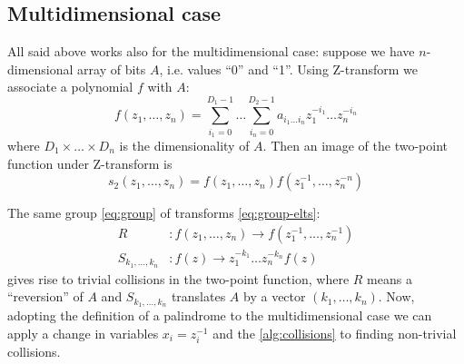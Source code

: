 \documentclass[12pt, a4paper]{article}
\begin{document}
\subsection{Multidimensional case}
All said above works also for the multidimensional case: suppose we have
$n$-dimensional array of bits $A$, i.e. values ``0'' and ``1''. Using
Z-transform we associate a polynomial $f$ with $A$:
\begin{equation*}
  f(z_1, \dots, z_n) = \sum_{i_1=0}^{D_1 - 1} \dots \sum_{i_n=0}^{D_2 - 1}
  a_{i_1\dots i_n} z_1^{-i_1} \dots z_n^{-i_n}
\end{equation*}
where $D_1 \times \dots \times D_n$ is the dimensionality of $A$. Then an image
of the two-point function under Z-transform is
\begin{equation}
  s_2(z_1, \dots, z_n) = f(z_1, \dots, z_n)f(z_1^{-1}, \dots, z_n^{-n})
  \label{eq:s2z-md}
\end{equation}

The same group \cref{eq:group} of transforms \cref{eq:group-elts}:
\begin{equation}
  \begin{aligned}
    R&: f(z_1, \dots, z_n) \rightarrow f(z_1^{-1}, \dots, z_n^{-1}) \\
    S_{k_1, \dots, k_n}&: f(z) \rightarrow z_1^{-k_1}\dots z_n^{-k_n}f(z)
  \end{aligned}
  \label{eq:group-elts-md}
\end{equation}
gives rise to trivial collisions in the two-point function, where $R$ means a
``reversion'' of $A$ and $S_{k_1, \dots, k_n}$ translates $A$ by a vector
$(k_1, \dots, k_n)$. Now, adopting the definition of a palindrome to the
multidimensional case we can apply a change in variables $x_i = z_i^{-1}$ and
the \cref{alg:collisions} to finding non-trivial collisions.
\end{document}
